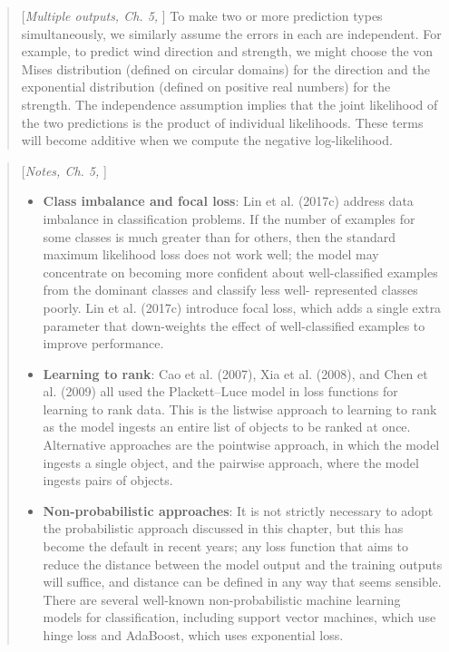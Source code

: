 \documentclass{myclass}
\numberwithin{equation}{subsection}
\begin{document}
\begin{quote}[\textit{Multiple outputs, Ch. 5,} \cite{prince2023understanding}]
To make two or more prediction types simultaneously, we similarly assume the errors in each are
independent. For example, to predict wind direction and strength, we might choose the von Mises
distribution (defined on circular domains) for the direction and the exponential distribution
(defined on positive real numbers) for the strength. The independence assumption implies that the
joint likelihood of the two predictions is the product of individual likelihoods. These terms will
become additive when we compute the negative log-likelihood.
\end{quote}

\begin{quote}[\textit{Notes, Ch. 5,} \cite{prince2023understanding}]
\begin{itemize}
\item \textbf{Class imbalance and focal loss}: Lin et al. (2017c) address data imbalance in
classification problems. If the number of examples for some classes is much greater than for others,
then the standard maximum likelihood loss does not work well; the model may concentrate on becoming
more confident about well-classified examples from the dominant classes and classify less well-
represented classes poorly. Lin et al. (2017c) introduce focal loss, which adds a single extra
parameter that down-weights the effect of well-classified examples to improve performance.

\item \textbf{Learning to rank}: Cao et al. (2007), Xia et al. (2008), and Chen et al. (2009) all
used the Plackett--Luce model in loss functions for learning to rank data. This is the listwise
approach to learning to rank as the model ingests an entire list of objects to be ranked at once.
Alternative approaches are the pointwise approach, in which the model ingests a single object, and
the pairwise approach, where the model ingests pairs of objects.

\item \textbf{Non-probabilistic approaches}: It is not strictly necessary to adopt the probabilistic
approach discussed in this chapter, but this has become the default in recent years; any loss
function that aims to reduce the distance between the model output and the training outputs will
suffice, and distance can be defined in any way that seems sensible. There are several well-known
non-probabilistic machine learning models for classification, including support vector machines,
which use hinge loss and AdaBoost, which uses exponential loss.
\end{itemize}
\end{quote}
\end{document}
